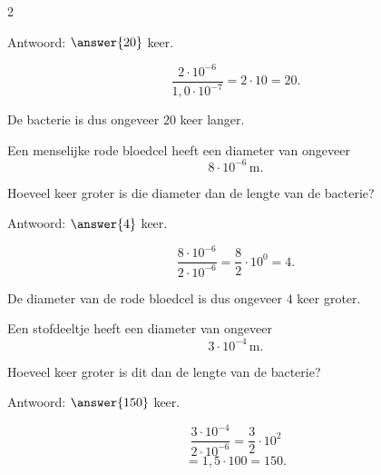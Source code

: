 \documentclass{ximera}
\begin{document}
\begin{oefening}{\oefU}
\begin{multicols}{2}
\begin{question}
                Antwoord: $\answer{20}$ keer.
                
                \begin{oplossing}
                \[
                \dfrac{2\cdot10^{-6}}{1{,}0\cdot10^{-7}}
                =2\cdot10
                =20.
                \]
                
                De bacterie is dus ongeveer $20$ keer langer.
                \end{oplossing}
                \end{question}
                
                
                \begin{question}
                Een menselijke rode bloedcel heeft een diameter van ongeveer
                \[
                8\cdot10^{-6}\,\mathrm m.
                \]
                
                Hoeveel keer groter is die diameter dan de lengte van de bacterie?
                
                Antwoord: $\answer{4}$ keer.
                
                \begin{oplossing}
                \[
                \dfrac{8\cdot10^{-6}}{2\cdot10^{-6}}
                =\dfrac82\cdot10^0
                =4.
                \]
                
                De diameter van de rode bloedcel is dus ongeveer $4$ keer groter.
                \end{oplossing}
                \end{question}
                
                
                \begin{question}
                Een stofdeeltje heeft een diameter van ongeveer
                \[
                3\cdot10^{-4}\,\mathrm m.
                \]
                
                Hoeveel keer groter is dit dan de lengte van de bacterie?
                
                Antwoord: $\answer{150}$ keer.
                
                \begin{oplossing}
                \[
                \dfrac{3\cdot10^{-4}}{2\cdot10^{-6}}
                =\dfrac32\cdot10^2
                \]
                \[
                =1{,}5\cdot100
                =150.
                \]
                \end{oplossing}
                \end{question}
                

\end{multicols}
\end{oefening}
\end{document}
